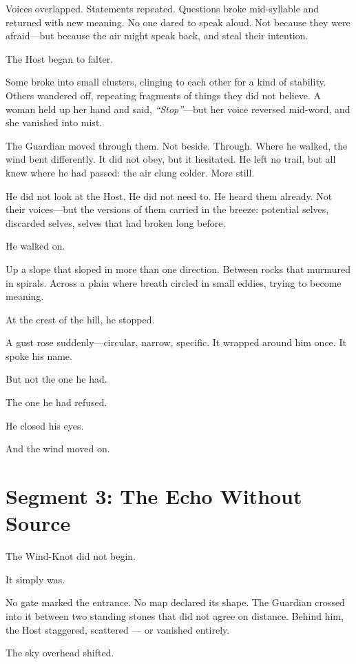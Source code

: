 \documentclass[9pt]{article}
\begin{document}
Voices overlapped. Statements repeated. Questions broke mid-syllable and returned with new meaning. No one dared to speak aloud. Not because they were afraid—but because the air might speak back, and steal their intention.

The Host began to falter.

Some broke into small clusters, clinging to each other for a kind of stability. Others wandered off, repeating fragments of things they did not believe. A woman held up her hand and said, \textit{``Stop''}—but her voice reversed mid-word, and she vanished into mist.

The Guardian moved through them. Not beside. Through. Where he walked, the wind bent differently. It did not obey, but it hesitated. He left no trail, but all knew where he had passed: the air clung colder. More still.

He did not look at the Host. He did not need to. He heard them already. Not their voices—but the versions of them carried in the breeze: potential selves, discarded selves, selves that had broken long before.

He walked on.

Up a slope that sloped in more than one direction. Between rocks that murmured in spirals. Across a plain where breath circled in small eddies, trying to become meaning.

At the crest of the hill, he stopped.

A gust rose suddenly—circular, narrow, specific. It wrapped around him once. It spoke his name.

But not the one he had.

The one he had refused.

He closed his eyes.

And the wind moved on.

\newpage

\section*{Segment 3: The Echo Without Source}

The Wind-Knot did not begin.

It simply was.

No gate marked the entrance. No map declared its shape. The Guardian crossed into it between two standing stones that did not agree on distance. Behind him, the Host staggered, scattered — or vanished entirely.

The sky overhead shifted.
\end{document}
